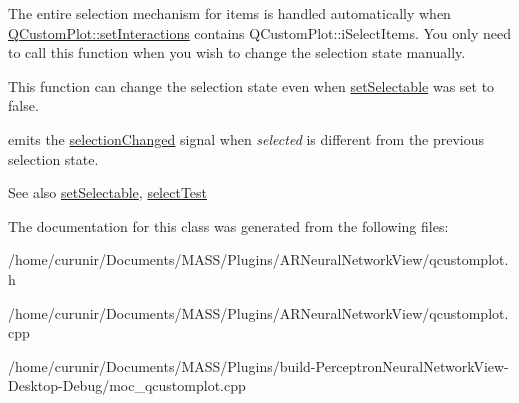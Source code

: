 The entire selection mechanism for items is handled automatically when \hyperlink{class_q_custom_plot_a5ee1e2f6ae27419deca53e75907c27e5}{Q\+Custom\+Plot\+::set\+Interactions} contains Q\+Custom\+Plot\+::i\+Select\+Items. You only need to call this function when you wish to change the selection state manually.

This function can change the selection state even when \hyperlink{class_q_c_p_abstract_item_a8a8e32a55bc478b849756a78c2d87fd2}{set\+Selectable} was set to false.

emits the \hyperlink{class_q_c_p_abstract_item_aa5cffb034fc65dbb91c77e02c1c14251}{selection\+Changed} signal when {\itshape selected} is different from the previous selection state.

\begin{DoxySeeAlso}{See also}
\hyperlink{class_q_c_p_abstract_item_a8a8e32a55bc478b849756a78c2d87fd2}{set\+Selectable}, \hyperlink{class_q_c_p_abstract_item_ae41d0349d68bb802c49104afd100ba2a}{select\+Test} 
\end{DoxySeeAlso}


The documentation for this class was generated from the following files\+:\begin{DoxyCompactItemize}
\item 
/home/curunir/\+Documents/\+M\+A\+S\+S/\+Plugins/\+A\+R\+Neural\+Network\+View/qcustomplot.\+h\item 
/home/curunir/\+Documents/\+M\+A\+S\+S/\+Plugins/\+A\+R\+Neural\+Network\+View/qcustomplot.\+cpp\item 
/home/curunir/\+Documents/\+M\+A\+S\+S/\+Plugins/build-\/\+Perceptron\+Neural\+Network\+View-\/\+Desktop-\/\+Debug/moc\+\_\+qcustomplot.\+cpp\end{DoxyCompactItemize}
